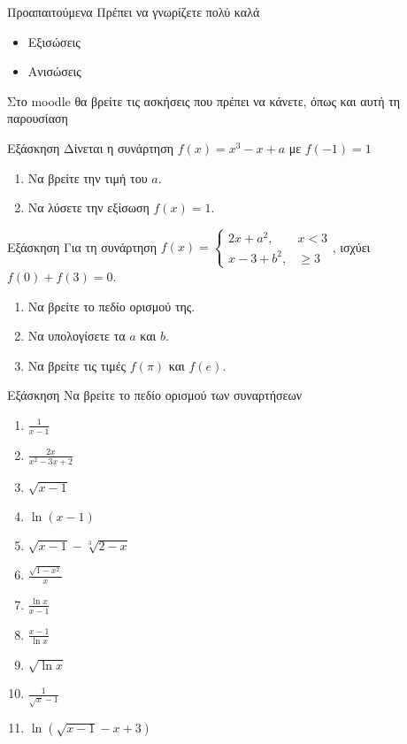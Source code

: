 \documentclass[greek]{beamer}
\begin{document}
\begin{frame}{Προαπαιτούμενα}
 Πρέπει να γνωρίζετε πολύ καλά
 \begin{itemize}
  \item Εξισώσεις
  \item Ανισώσεις
 \end{itemize}
\end{frame}

\begin{frame}
  Στο moodle θα βρείτε τις ασκήσεις που πρέπει να κάνετε, όπως και αυτή τη παρουσίαση
\end{frame}

\begin{frame}{Εξάσκηση}
  Δίνεται η συνάρτηση $f(x)=x^3-x+a$ με $f(-1)=1$
  \begin{enumerate}
    \item<1-> Να βρείτε την τιμή του $a$.
    \item<2-> Να λύσετε την εξίσωση $f(x)=1$.
  \end{enumerate}
\end{frame}

\begin{frame}{Εξάσκηση}
  Για τη συνάρτηση $f(x)=\begin{cases}
    2x+a^2, & x<3 \\
    x-3+b^2, & \ge3
  \end{cases}$, ισχύει $f(0)+f(3)=0$.
  \begin{enumerate}
    \item<1-> Να βρείτε το πεδίο ορισμού της.
    \item<2-> Να υπολογίσετε τα $a$ και $b$.
    \item<3-> Να βρείτε τις τιμές $f(\pi)$ και $f(e)$.
  \end{enumerate}
\end{frame}

\begin{frame}{Εξάσκηση}
  Να βρείτε το πεδίο ορισμού των συναρτήσεων
  \begin{enumerate}
    \item<1-> $\frac{1}{x-1}$
    \item<2-> $\frac{2x}{x^2-3x+2}$
    \item<3-> $\sqrt{x-1}$
    \item<4-> $\ln (x-1)$
    \item<5-> $\sqrt{x-1}-\sqrt[3]{2-x}$
    \item<6-> $\frac{\sqrt{1-x^2}}{x}$
    \item<7-> $\frac{\ln x}{x-1}$
    \item<8-> $\frac{x-1}{\ln x}$
    \item<9-> $\sqrt{\ln x}$
    \item<10-> $\frac{1}{\sqrt{x}-1}$
    \item<11-> $\ln \left(\sqrt{x-1}-x+3\right)$
  \end{enumerate}
\end{frame}
\end{document}

